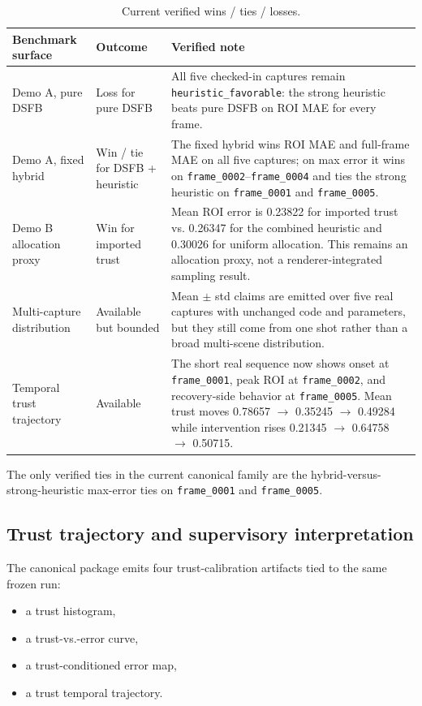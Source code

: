 \documentclass[11pt,letterpaper]{article}
\theoremstyle{gcresult}
\theoremstyle{definition}
\begin{document}
\begin{table}[H]
\centering
\caption{Current verified wins / ties / losses.}
\label{tab:wins-losses}
\begin{tabular}{p{3.2cm} p{2.8cm} p{7.4cm}}
\toprule
Benchmark surface & Outcome & Verified note \\
\midrule
Demo A, pure DSFB & Loss for pure DSFB & All five checked-in captures remain \texttt{heuristic\_favorable}: the strong heuristic beats pure DSFB on ROI MAE for every frame. \\
Demo A, fixed hybrid & Win / tie for DSFB + heuristic & The fixed hybrid wins ROI MAE and full-frame MAE on all five captures; on max error it wins on \texttt{frame\_0002}--\texttt{frame\_0004} and ties the strong heuristic on \texttt{frame\_0001} and \texttt{frame\_0005}. \\
Demo B allocation proxy & Win for imported trust & Mean ROI error is 0.23822 for imported trust vs. 0.26347 for the combined heuristic and 0.30026 for uniform allocation. This remains an allocation proxy, not a renderer-integrated sampling result. \\
Multi-capture distribution & Available but bounded & Mean $\pm$ std claims are emitted over five real captures with unchanged code and parameters, but they still come from one shot rather than a broad multi-scene distribution. \\
Temporal trust trajectory & Available & The short real sequence now shows onset at \texttt{frame\_0001}, peak ROI at \texttt{frame\_0002}, and recovery-side behavior at \texttt{frame\_0005}. Mean trust moves 0.78657 $\rightarrow$ 0.35245 $\rightarrow$ 0.49284 while intervention rises 0.21345 $\rightarrow$ 0.64758 $\rightarrow$ 0.50715. \\
\bottomrule
\end{tabular}
\end{table}

The only verified ties in the current canonical family are the hybrid-versus-strong-heuristic max-error ties on \texttt{frame\_0001} and \texttt{frame\_0005}.

\subsection{Trust trajectory and supervisory interpretation}

The canonical package emits four trust-calibration artifacts tied to the same frozen run:
\begin{itemize}[leftmargin=1.5em]
    \item a trust histogram,
    \item a trust-vs.-error curve,
    \item a trust-conditioned error map,
    \item a trust temporal trajectory.
\end{itemize}
\end{document}
